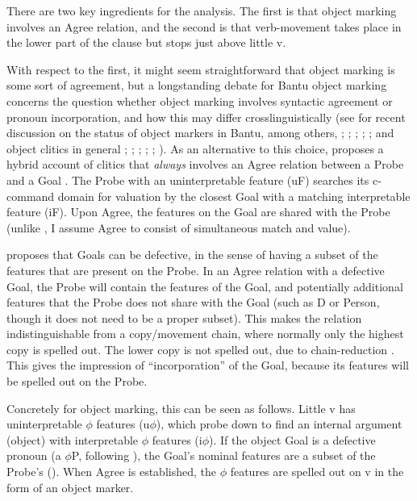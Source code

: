\documentclass[output=paper
,modfonts
,nonflat]{langsci/langscibook}
\begin{document}
There are two key ingredients for the analysis. The first is that object marking involves an Agree relation, and the second is that verb-movement takes place in the lower part of the clause but stops just above little v.

With respect to the first, it might seem straightforward that object marking is some sort of agreement, but a longstanding debate for Bantu object marking concerns the question whether object marking involves syntactic agreement or pronoun incorporation, and how this may differ crosslinguistically (see for recent discussion on the status of object markers in Bantu, among others, \citealt{Henderson2006}; \citealt{Riedel2009}; \citealt{Zeller2012}; \citealt{Iorio2014}; \citealt{Baker2016}; and object clitics in general \citealt{Preminger2009}; \citealt{Nevins2011}; \citealt{Anagnostopoulou2014, Anagnostopoulou2016}; \citealt{Kramer2014}; \citealt{Harizanov2014}; \citealt{Baker_Kramer2016}). As an alternative to this choice, \citet{Roberts2010} proposes a hybrid account of clitics that \textit{always} involves an Agree relation between a Probe and a Goal \citep{Chomsky2000, Chomsky2001}. The Probe with an uninterpretable feature (uF) searches its c-command domain for valuation by the closest Goal with a matching interpretable feature (iF). Upon Agree, the features on the Goal are shared with the Probe (unlike , I assume Agree to consist of simultaneous match and value).

\citet{Roberts2010} proposes that Goals can be defective, in the sense of having a subset of the features that are present on the Probe. In an Agree relation with a defective Goal, the Probe will contain the features of the Goal, and potentially additional features that the Probe does not share with the Goal (such as D or Person, though it does not need to be a proper subset). This makes the relation indistinguishable from a copy/movement chain, where normally only the highest copy is spelled out. The lower copy is not spelled out, due to chain-reduction \citep{Nunes2004}. This gives the impression of “incorporation” of the Goal, because its features will be spelled out on the Probe.

Concretely for object marking, this can be seen as follows. Little v has uninterpretable $\phi $ features (u$\phi$), which probe down to find an internal argument (object) with interpretable $\phi$ features (i$\phi$). If the object Goal is a defective pronoun (a $\phi$P, following \citealt{Dechaine_Wiltschko2002}), the Goal’s nominal features are a subset of the Probe’s (). When Agree is established, the $\phi$ features are spelled out on v in the form of an object marker.
\end{document}
